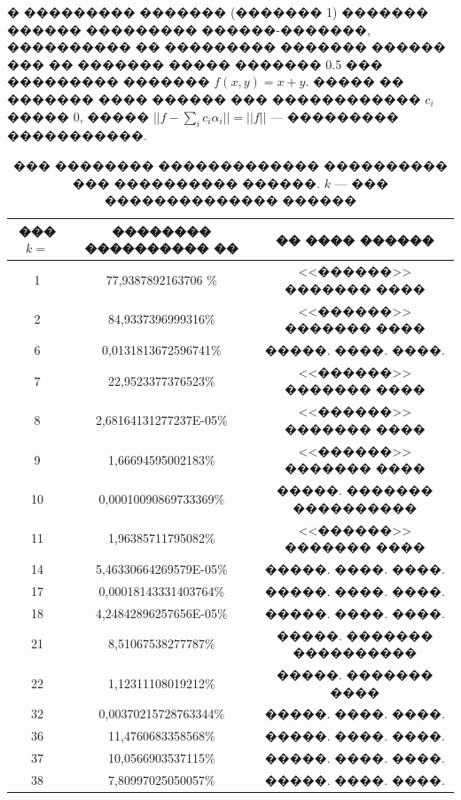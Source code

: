 \documentclass[a4paper]{article}
\begin{document}
� ��������� ������� (������� 1) ������� ������ ��������� ������-�������, ���������� �� ��������� ������� ������ ��� �� ������� ����� ������� 0.5 ��� ��������� ������� $f(x,y)=x+y$.
����� �� ������� ���� ������ ��� ������������ $c_i$ ����� 0, ����� $||f-\sum_i c_i \alpha_i||=||f||$ --- ��������� �����������.

\begin{table}[h]

  \label{tabl}
  \caption{��� �������� ������������� ���������� ��� ���������� ������. $k$ --- ��� �������������� ������}
  \begin{center}
    \begin{tabular}[t]{|c|c|c|}
      \hline
      ��� $k=$ & �������� ���������� �� & �� ���� ������            \\
      \hline
      1        & 77,9387892163706 \%    & <<������>> ������� ����   \\
      2        & 84,9337396999316\%     & <<������>> ������� ����   \\
      6        & 0,0131813672596741\%   & �����. ����. ����.   \\
      7        & 22,9523377376523\%     & <<������>> ������� ����   \\
      8        & 2,68164131277237E-05\% & <<������>> ������� ����   \\
      9        & 1,66694595002183\%     & <<������>> ������� ����   \\
      10       & 0,00010090869733369\%  & �����. ������� ���������� \\
      11       & 1,96385711795082\%     & <<������>> ������� ����   \\
      14       & 5,46330664269579E-05\% & �����. ����. ����.   \\
      17       & 0,00018143331403764\%  & �����. ����. ����.   \\
      18       & 4,24842896257656E-05\% & �����. ����. ����.   \\
      21       & 8,51067538277787\%     & �����. ������� ���������� \\
      22       & 1,12311108019212\%     & �����. ������� ����       \\
      32       & 0,00370215728763344\%  & �����. ����. ����.   \\
      36       & 11,4760683358568\%     & �����. ����. ����.   \\
      37       & 10,0566903537115\%     & �����. ����. ����.   \\
      38       & 7,80997025050057\%     & �����. ����. ����.   \\

\end{tabular}
\end{center}
\end{table}
\end{document}
